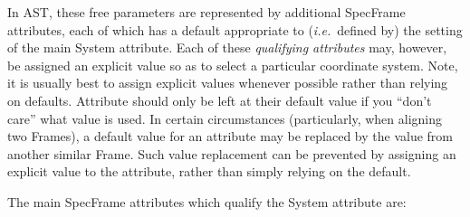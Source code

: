 \documentclass[twoside,11pt]{article}
\begin{document}
In AST, these free parameters are represented by additional SpecFrame
attributes, each of which has a default appropriate to
({\em{i.e.}}\ defined by) the setting of the main System
attribute. Each of these {\em{qualifying attributes}} may, however, be
assigned an explicit value so as to select a particular coordinate
system. Note, it is usually best to assign explicit
values whenever possible rather than relying on defaults. Attribute
should only be left at their default value if you ``don't care'' what
value is used. In certain circumstances (particularly, when aligning two
Frames), a default value for an attribute may be replaced by the value
from another similar Frame. Such value replacement can be prevented by
assigning an explicit value to the attribute, rather than simply relying on
the default.


The main SpecFrame attributes which qualify the System attribute are:
\end{document}
